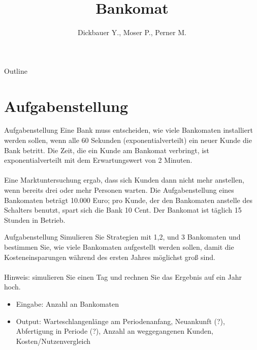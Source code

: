 

\title[BSP29 - Bankomat]{Bankomat}
\author{Dickbauer Y., Moser P., Perner M.}



\begin{frame}
  \titlepage
\end{frame}

\begin{frame}{Outline}
  \tableofcontents
\end{frame}

\section{Aufgabenstellung}
\begin{frame}{Aufgabenstellung}
Eine Bank muss entscheiden, wie viele Bankomaten installiert werden sollen, wenn alle 60 Sekunden (exponentialverteilt) ein neuer Kunde die Bank betritt. Die Zeit, die ein Kunde am Bankomat verbringt, ist exponentialverteilt mit dem Erwartungswert von 2 Minuten.
\\~\\
Eine Marktuntersuchung ergab, dass sich Kunden dann nicht mehr anstellen, wenn bereits drei oder mehr Personen warten. Die Aufgabenstellung eines Bankomaten beträgt 10.000 Euro; pro Kunde, der den Bankomaten anstelle des Schalters benutzt, spart sich die Bank 10 Cent. Der Bankomat ist täglich 15 Stunden in Betrieb.
\end{frame}

\begin{frame}{Aufgabenstellung}
Simulieren Sie Strategien mit 1,2, und 3 Bankomaten und bestimmen Sie, wie viele Bankomaten aufgestellt werden sollen, damit die Kosteneinsparungen während des ersten Jahres möglichst groß sind.
\\~\\
Hinweis: simulieren Sie einen Tag und rechnen Sie das Ergebnis auf ein Jahr hoch.
\vspace{1cm}
\begin{itemize}
  \item Eingabe: Anzahl an Bankomaten
  \item Output: Warteschlangenlänge am Periodenanfang, Neuankunft (?), Abfertigung in Periode (?), Anzahl an weggegangenen Kunden, Kosten/Nutzenvergleich
\end{itemize}
\end{frame}

